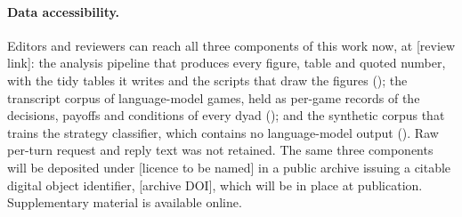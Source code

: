 \documentclass[11pt,a4paper]{article}
\begin{document}
\paragraph{Data accessibility.} Editors and reviewers can reach all three
components of this work now, at [review link]: the analysis pipeline that
produces every figure, table and quoted number, with the tidy tables it writes
and the scripts that draw the figures (); the transcript
corpus of language-model games, held as per-game records of the decisions,
payoffs and conditions of every dyad ();
and the synthetic corpus that trains the strategy classifier, which contains no
language-model output (). Raw per-turn request and
reply text was not retained. The same three components will be deposited under
[licence to be named] in a public archive issuing a citable digital object
identifier, [archive DOI], which will be in place at publication. Supplementary
material is available online.
\end{document}
